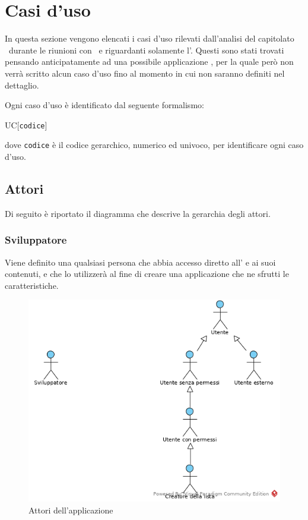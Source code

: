 \section{Casi d'uso}
In questa sezione vengono elencati i casi d'uso rilevati dall'analisi del capitolato \capitolato\ durante le riunioni con \RB\ e  riguardanti solamente l'. Questi sono stati trovati pensando anticipatamente ad una possibile applicazione , per la quale però non verrà scritto alcun caso d'uso fino al momento in cui non saranno definiti nel dettaglio.

Ogni caso d'uso è identificato dal seguente formalismo:
\begin{center}
	UC[\texttt{codice}]
\end{center}
dove \texttt{codice} è il codice gerarchico, numerico ed univoco, per identificare ogni caso d'uso.

\subsection{Attori}
Di seguito è riportato il diagramma  che descrive la gerarchia degli attori.

\subsubsection{Sviluppatore}
Viene definito  una qualsiasi persona che abbia accesso diretto all' e ai suoi contenuti, e che lo utilizzerà al fine di creare una applicazione che ne sfrutti le caratteristiche.
\label{Attori}
\begin{figure}[ht]
	\centering
	\includegraphics[scale=1]{Usecases/img/Attori.png}
	\caption{Attori dell'applicazione}
\end{figure}



